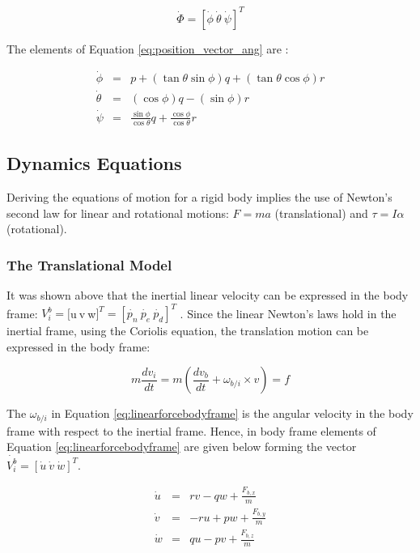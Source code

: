 \begin{equation} \label{eq:position_vector_ang}
	\dot{\Phi} = [\dot{\phi}\ \dot{\theta}\ \dot{\psi}]^T
\end{equation}

The elements of Equation \ref{eq:position_vector_ang} are \cite{article:letter}:

\begin{eqnarray}
	\dot{\phi} & = & p + (\tan\theta \sin\phi)q + (\tan\theta \cos\phi) r \\
	\dot{\theta} &= & (\cos\phi) q - (\sin\phi) r \\
	\dot{\psi} &= & \frac{\sin\phi}{\cos\theta} q + \frac{\cos\phi}{\cos\theta} r
\end{eqnarray}

\subsection{Dynamics Equations}
Deriving the equations of motion for a rigid body implies the use of Newton's second law for linear and rotational motions: $F = ma$ (translational) and $\tau = I \alpha$ (rotational). \\

\subsubsection{The Translational Model}
It was shown above that the inertial linear velocity can be expressed in the body frame: $ V_i^b = [$u$\ $v$\ $w$]^T = [\dot{p_n}\ \dot{p_e}\ \dot{p_d}]^T$ \cite{article:letter}. Since the linear Newton's laws hold in the inertial frame, using the Coriolis equation, the translation motion can be expressed in the body frame:

\begin{equation}  \label{eq:linearforcebodyframe}
	m\frac{dv_i}{dt} = m(\frac{dv_b}{dt} + \omega_{b/i} \times v) = f
\end{equation}

The $\omega_{b/i}$ in Equation \ref{eq:linearforcebodyframe} is the angular velocity in the body frame with respect to the inertial frame. Hence, in body frame elements of Equation \ref{eq:linearforcebodyframe} are given below forming the vector $ \dot{V_i^b} = [\dot{u}\ \dot{v}\ \dot{w}]^T$.

\begin{eqnarray}{}
	\dot{u} &= & rv -qw + \frac{F_{b,x}}{m} \\
	\dot{v} &= & -ru + pw + \frac{F_{b,y}}{m} \\
	\dot{w} &= & qu -pv + \frac{F_{b,z}}{m} 
\end{eqnarray}


